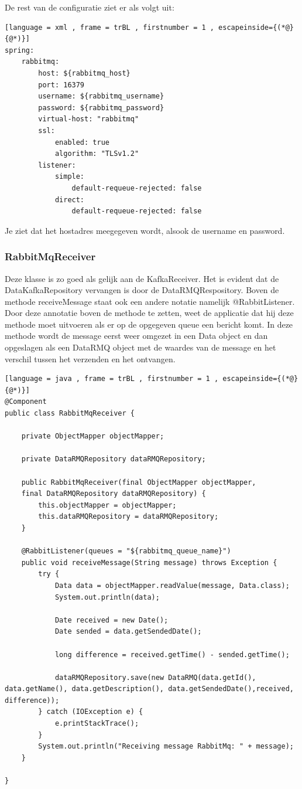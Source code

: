 De rest van de configuratie ziet er als volgt uit: 
\begin{lstlisting}[language = xml , frame = trBL , firstnumber = 1 , escapeinside={(*@}{@*)}]
spring:
    rabbitmq:
        host: ${rabbitmq_host}
        port: 16379
        username: ${rabbitmq_username}
        password: ${rabbitmq_password}
        virtual-host: "rabbitmq"
        ssl:
            enabled: true
            algorithm: "TLSv1.2"
        listener:
            simple:
                default-requeue-rejected: false
            direct:
                default-requeue-rejected: false
\end{lstlisting}

Je ziet dat het hostadres meegegeven wordt, alsook de username en password.
\subsubsection{RabbitMqReceiver}
Deze klasse is zo goed als gelijk aan de KafkaReceiver. Het is evident dat de DataKafkaRepository vervangen is door de DataRMQRespository. Boven de methode receiveMessage staat ook een andere notatie namelijk @RabbitListener. Door deze annotatie boven de methode te zetten, weet de applicatie dat hij deze methode moet uitvoeren als er op de opgegeven queue een bericht komt. In deze methode wordt de message eerst weer omgezet in een Data object en dan opgeslagen als een DataRMQ object met de waardes van de message en het verschil tussen het verzenden en het ontvangen.
\begin{lstlisting}[language = java , frame = trBL , firstnumber = 1 , escapeinside={(*@}{@*)}]
@Component
public class RabbitMqReceiver {
    
    private ObjectMapper objectMapper;
    
    private DataRMQRepository dataRMQRepository;
    
    public RabbitMqReceiver(final ObjectMapper objectMapper,
    final DataRMQRepository dataRMQRepository) {
        this.objectMapper = objectMapper;
        this.dataRMQRepository = dataRMQRepository;
    }
    
    @RabbitListener(queues = "${rabbitmq_queue_name}")
    public void receiveMessage(String message) throws Exception {
        try {
            Data data = objectMapper.readValue(message, Data.class);
            System.out.println(data);
            
            Date received = new Date();
            Date sended = data.getSendedDate();
            
            long difference = received.getTime() - sended.getTime();
            
            dataRMQRepository.save(new DataRMQ(data.getId(), data.getName(), data.getDescription(), data.getSendedDate(),received, difference));
        } catch (IOException e) {
            e.printStackTrace();
        }
        System.out.println("Receiving message RabbitMq: " + message);
    }
   
}
\end{lstlisting}

